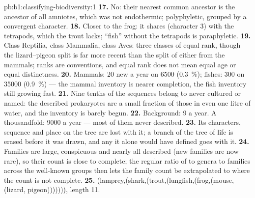 \begin{solution}{pb:b1:classifying-biodiversity:1}
\textbf{17.} No: their nearest common ancestor is the ancestor of all
amniotes, which was not endothermic; polyphyletic, grouped by a
convergent character.
\textbf{18.} Closer to the frog: it shares  (character 3) with the
tetrapods, which the trout lacks; ``fish'' without the tetrapods is
paraphyletic.
\textbf{19.} Class Reptilia, class Mammalia, class Aves: three classes
of equal rank, though the lizard--pigeon split is far more recent
than the split of either from the mammals; ranks are conventions, and
equal rank does not mean equal age or equal distinctness.
\textbf{20.} Mammals: \num{20} new a year on \num{6500} (\qty{0.3}{\%});
fishes: \num{300} on \num{35000} (\qty{0.9}{\%}) --- the mammal
inventory is nearer completion, the fish inventory still growing
fast.
\textbf{21.} Nine tenths of the sequences belong to  never
cultured or named: the described prokaryotes are a small fraction of
those in even one litre of water, and the inventory is barely begun.
\textbf{22.} Background: \num{9} a year. A thousandfold: \num{9000} a
year --- most of them  never described.
\textbf{23.} Its characters, sequence and place on the tree are lost
with it; a branch of the tree of life is erased before it was drawn,
and any  it alone would have defined goes with it.
\textbf{24.} Families are large, conspicuous and nearly all described
(new families are now rare), so their count is close to complete;
the regular ratio of  to genera to families across the
well-known groups then lets the family count be extrapolated to
 where the  count is not complete.
\textbf{25.} (lamprey,(shark,(trout,(lungfish,(frog,(mouse,(lizard,
pigeon))))))), length \num{11}.
\end{solution}
